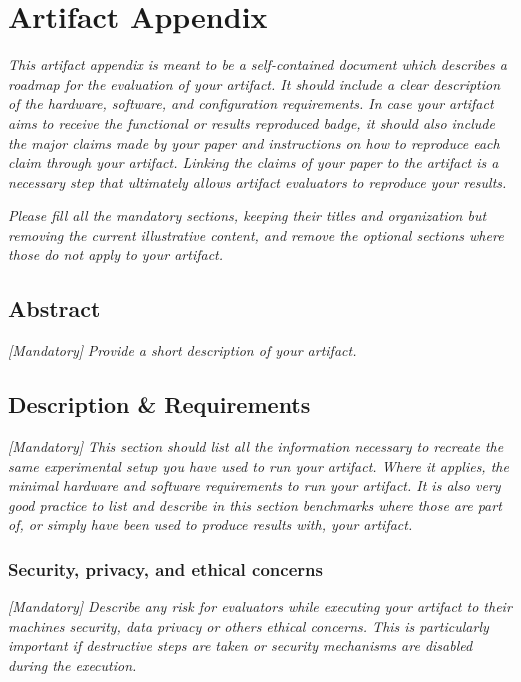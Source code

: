 
\section{Artifact Appendix}
\textit{This artifact appendix is meant to be a self-contained document which
describes a roadmap for the evaluation of your artifact. It should include a
clear description of the hardware, software, and configuration requirements. In
case your artifact aims to receive the functional or results reproduced badge,
it should also include the major claims made by your paper and instructions on
how to reproduce each claim through your artifact. Linking the claims of your
paper to the artifact is a necessary step that ultimately allows artifact
evaluators to reproduce your results.}

\textit{Please fill all the mandatory sections, keeping their titles and
organization but removing the current illustrative content, and remove the
optional sections where those do not apply to your artifact.}

\subsection{Abstract}
{\em [Mandatory]}
{\em Provide a short description of your artifact.}

\subsection{Description \& Requirements}

\textit{[Mandatory] This section should list all the information necessary to
recreate the same experimental setup you have used to run your artifact. Where
it applies, the minimal hardware and software requirements to run your artifact.
It is also very good practice to list and describe in this section benchmarks
where those are part of, or simply have been used to produce results with, your
artifact.}

\subsubsection{Security, privacy, and ethical concerns}
\textit{[Mandatory] Describe any risk for evaluators while executing your
artifact to their machines security, data privacy or others ethical concerns.
This is particularly important if destructive steps are taken or security
mechanisms are disabled during the execution.}

